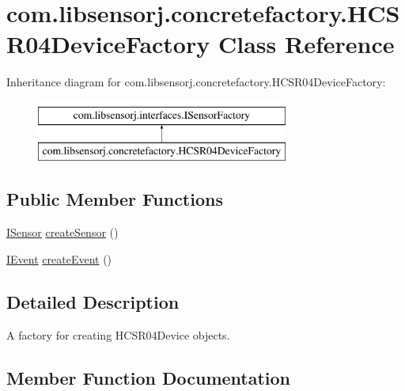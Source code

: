 \hypertarget{classcom_1_1libsensorj_1_1concretefactory_1_1HCSR04DeviceFactory}{}\section{com.\+libsensorj.\+concretefactory.\+H\+C\+S\+R04\+Device\+Factory Class Reference}
\label{classcom_1_1libsensorj_1_1concretefactory_1_1HCSR04DeviceFactory}
Inheritance diagram for com.\+libsensorj.\+concretefactory.\+H\+C\+S\+R04\+Device\+Factory\+:\begin{figure}[H]
\begin{center}
\leavevmode
\includegraphics[height=2.000000cm]{classcom_1_1libsensorj_1_1concretefactory_1_1HCSR04DeviceFactory}
\end{center}
\end{figure}
\subsection*{Public Member Functions}
\begin{DoxyCompactItemize}
\item 
\hyperlink{interfacecom_1_1libsensorj_1_1interfaces_1_1ISensor}{I\+Sensor} \hyperlink{classcom_1_1libsensorj_1_1concretefactory_1_1HCSR04DeviceFactory_a3d5c07b9ce458a3f56cfe5e7470b51df}{create\+Sensor} ()
\item 
\hyperlink{classcom_1_1libsensorj_1_1interfaces_1_1IEvent}{I\+Event} \hyperlink{classcom_1_1libsensorj_1_1concretefactory_1_1HCSR04DeviceFactory_aea88b0202d3021c4e55bd9cbf64da906}{create\+Event} ()
\end{DoxyCompactItemize}


\subsection{Detailed Description}
A factory for creating H\+C\+S\+R04\+Device objects. 

\subsection{Member Function Documentation}
\hypertarget{classcom_1_1libsensorj_1_1concretefactory_1_1HCSR04DeviceFactory_aea88b0202d3021c4e55bd9cbf64da906}{}
